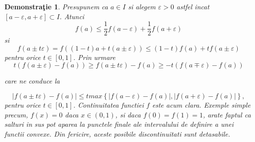 \documentclass[a4paper,12pt,oneside]{report}
\newtheorem{demonstration}{Demonstra\c tie}
\begin{document}
\begin{demonstration}
	Presupunem ca \(a\in I\)
 si alegem \(\varepsilon > 0\)
 astfel incat \(\left [ a - \varepsilon , a + \varepsilon  \right ] \subset I\).
 Atunci  
\begin{displaymath}
  f\left ( a \right )\leq \frac{1}{2} f\left ( a - \varepsilon  \right ) + \frac{1}{2}f \left ( a + \varepsilon  \right )
\end{displaymath}
si 
\begin{displaymath}
  f\left ( a \pm t\varepsilon  \right )= f\left ( \left ( 1 - t \right ) a + t\left ( a \pm \varepsilon  \right )\right )\leq \left ( 1 - t \right )f\left ( a \right ) + tf\left ( a\pm \varepsilon  \right )
\end{displaymath}
pentru orice \(t\in \left [ 0 , 1 \right ]\). Prin urmare 
\begin{displaymath}
  t\left ( f\left ( a\pm \varepsilon  \right ) - f\left ( a \right ) \right )\geq f\left ( a\pm t\varepsilon  \right )- f\left ( a \right )\geq -t\left ( f\left ( a\mp \varepsilon  \right ) - f\left ( a \right )\right )
\end{displaymath}

care ne conduce la 

\begin{displaymath}
\left | f\left ( a\pm t\varepsilon  \right )- f\left ( a \right ) \right |\leq t max \left \{ \left | f\left ( a-\varepsilon  \right )- f\left ( a \right ) \right |, \left | f\left ( a+\varepsilon  \right ) - f\left ( a \right )\right | \right \},
\end{displaymath}
 pentru orice \(t\in \left [ 0 , 1 \right ]\). Continuitatea functiei \(f\) este acum clara. 
	Exemple simple precum, \(f\left ( x \right )= 0\) daca \(x\in \left ( 0 , 1 \right )\), si daca \(f\left ( 0 \right )= f\left ( 1 \right ) = 1\), arate faptul ca salturi in sus pot aparea la punctele finale ale intervalului de definire a unei functii convexe. Din fericire, aceste posibile discontinuitati sunt detasabile. 

\end{demonstration}
\end{document}
